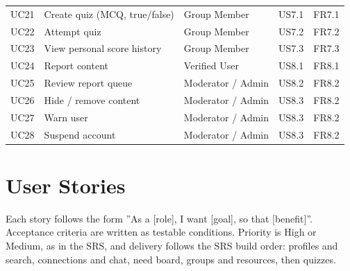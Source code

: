 \documentclass[10pt,a4paper]{article}
\begin{document}
{\begin{longtable}{@{}l >{\raggedright\arraybackslash}p{50mm} >{\raggedright\arraybackslash}p{38mm} >{\raggedright\arraybackslash}p{24mm} >{\raggedright\arraybackslash}p{22mm}@{}}
UC21 & Create quiz (MCQ, true/false) & Group Member & US7.1 & FR7.1\\
UC22 & Attempt quiz & Group Member & US7.2 & FR7.2\\
UC23 & View personal score history & Group Member & US7.3 & FR7.3\\
UC24 & Report content & Verified User & US8.1 & FR8.1\\
UC25 & Review report queue & Moderator / Admin & US8.2 & FR8.2\\
UC26 & Hide / remove content & Moderator / Admin & US8.3 & FR8.2\\
UC27 & Warn user & Moderator / Admin & US8.3 & FR8.2\\
UC28 & Suspend account & Moderator / Admin & US8.3 & FR8.2\\
\end{longtable}}
\section{User Stories}
Each story follows the form ''As a [role], I want [goal], so that [benefit]''. Acceptance criteria are written as testable conditions. Priority is High or Medium, as in the SRS, and delivery follows the SRS build order: profiles and search, connections and chat, need board, groups and resources, then quizzes.
\end{document}

